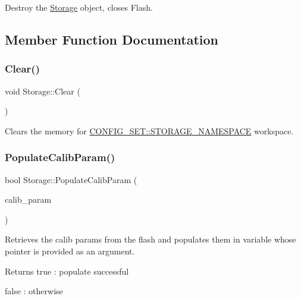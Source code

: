 Destroy the \hyperlink{classStorage}{Storage} object, closes Flash. 



\subsection{Member Function Documentation}
\mbox{\label{classStorage_acffef9e721035589505c170f2f612b07}} 
\subsubsection{\texorpdfstring{Clear()}{Clear()}}
{\footnotesize\ttfamily void Storage\+::\+Clear (\begin{DoxyParamCaption}{ }\end{DoxyParamCaption})}



Clears the memory for \hyperlink{namespaceCONFIG__SET_adc424e5a5b81f2016a88456fd2f383d9}{C\+O\+N\+F\+I\+G\+\_\+\+S\+E\+T\+::\+S\+T\+O\+R\+A\+G\+E\+\_\+\+N\+A\+M\+E\+S\+P\+A\+CE} workspace. 

\mbox{\label{classStorage_a92d3e34f9365b3a2b5e84ba5be442038}} 
\subsubsection{\texorpdfstring{Populate\+Calib\+Param()}{PopulateCalibParam()}}
{\footnotesize\ttfamily bool Storage\+::\+Populate\+Calib\+Param (\begin{DoxyParamCaption}\item[{\hyperlink{structCONFIG__SET_1_1CALIB__PARAMS}{C\+O\+N\+F\+I\+G\+\_\+\+S\+E\+T\+::\+C\+A\+L\+I\+B\+\_\+\+P\+A\+R\+A\+MS} $\ast$}]{calib\+\_\+param }\end{DoxyParamCaption})}



Retrieves the calib params from the flash and populates them in variable whose pointer is provided as an argument. 

\begin{DoxyReturn}{Returns}
true \+: populate successful 

false \+: otherwise 
\end{DoxyReturn}
\mbox{\label{classStorage_a6cd2e67130f5b1b753eea6e977ec4256}} 
